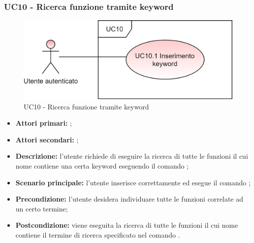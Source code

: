 \subsubsection{UC10 - Ricerca funzione tramite keyword}
\begin{figure}[H]
	\centering
	\includegraphics[scale=\ucs]{./res/img/UC10.png}
	\caption {UC10 - Ricerca funzione tramite keyword}
\end{figure}
\begin{itemize}
	\item \textbf{Attori primari:} \ua{};
	\item \textbf{Attori secondari:} \re{};
	\item \textbf{Descrizione:} l’utente richiede di eseguire la ricerca di tutte le funzioni il cui nome contiene una certa keyword eseguendo il comando \psearch{};
	\item \textbf{Scenario principale:} l’utente inserisce correttamente ed esegue il comando \psearch{}; 
	\item \textbf{Precondizione:} l’utente desidera individuare tutte le funzioni correlate ad un certo termine;
	\item \textbf{Postcondizione:} viene eseguita la ricerca di tutte le funzioni il cui nome contiene il termine di ricerca specificato nel comando \search{}.
\end{itemize}